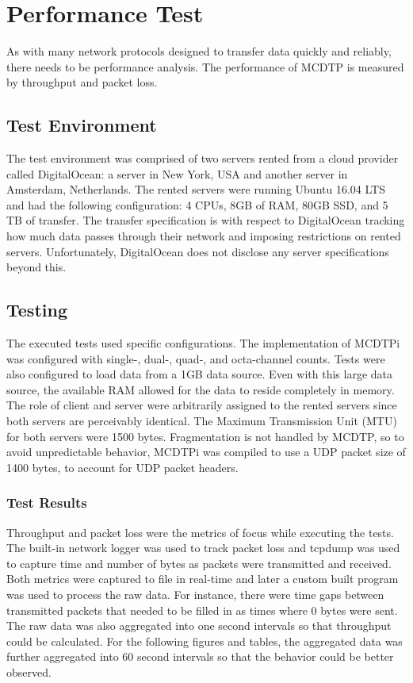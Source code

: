 \chapter{Performance Test}

As with many network protocols designed to transfer data quickly and reliably, there needs to be performance analysis. The performance of MCDTP is measured by throughput and packet loss.

\section{Test Environment}

The test environment was comprised of two servers rented from a cloud provider called DigitalOcean: a server in New York, USA and another server in Amsterdam, Netherlands. The rented servers were running Ubuntu 16.04 LTS and had the following configuration: 4 CPUs, 8GB of RAM, 80GB SSD, and 5 TB of transfer. The transfer specification is with respect to DigitalOcean tracking how much data passes through their network and imposing restrictions on rented servers. Unfortunately, DigitalOcean does not disclose any server specifications beyond this.

\section{Testing}

The executed tests used specific configurations. The implementation of MCDTPi was configured with single-, dual-, quad-, and octa-channel counts. Tests were also configured to load data from a 1GB data source. Even with this large data source, the available RAM allowed for the data to reside completely in memory. The role of client and server were arbitrarily assigned to the rented servers since both servers are perceivably identical. The Maximum Transmission Unit (MTU) for both servers were 1500 bytes. Fragmentation is not handled by MCDTP, so to avoid unpredictable behavior, MCDTPi was compiled to use a UDP packet size of 1400 bytes, to account for UDP packet headers.

\subsection{Test Results}

Throughput and packet loss were the metrics of focus while executing the tests. The built-in network logger was used to track packet loss and tcpdump was used to capture time and number of bytes as packets were transmitted and received. Both metrics were captured to file in real-time and later a custom built program was used to process the raw data. For instance, there were time gaps between transmitted packets that needed to be filled in as times where 0 bytes were sent. The raw data was also aggregated into one second intervals so that throughput could be calculated. For the following figures and tables, the aggregated data was further aggregated into 60 second intervals so that the behavior could be better observed.

